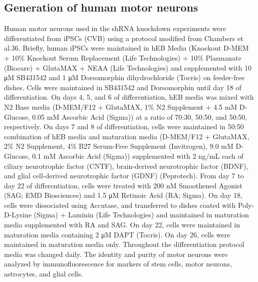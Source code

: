 \subsection{Generation of human motor neurons}
Human motor neurons used in the shRNA knockdown experiments were differentiated from iPSCs (CVB) using a protocol modified from Chambers et al.36. Briefly, human iPSCs were maintained in hEB Media (Knockout D-MEM + 10\% Knockout Serum Replacement (Life Technologies) + 10\% Plasmanate (Biocare) + GlutaMAX + NEAA (Life Technologies) and supplemented with 10 μM SB431542 and 1 μM Dorsomorphin dihydrochloride (Tocris) on feeder-free dishes. Cells were maintained in SB431542 and Dorsomorphin until day 18 of differentiation. On days 4, 5, and 6 of differentiation, hEB media was mixed with N2 Base media (D-MEM/F12 + GlutaMAX, 1\% N2 Supplement + 4.5 mM D-Glucose, 0.05 mM Ascorbic Acid (Sigma)) at a ratio of 70:30, 50:50, and 50:50, respectively. On days 7 and 8 of differentiation, cells were maintained in 50:50 combination of hEB media and maturation media (D-MEM/F12 + GlutaMAX, 2\% N2 Supplement, 4\% B27 Serum-Free Supplement (Invitrogen), 9.0 mM D-Glucose, 0.1 mM Ascorbic Acid (Sigma)) supplemented with 2 ng/mL each of ciliary neurotrophic factor (CNTF), brain-derived neurotrophic factor (BDNF), and glial cell-derived neurotrophic factor (GDNF) (Peprotech). From day 7 to day 22 of differentiation, cells were treated with 200 nM Smoothened Agonist (SAG; EMD Biosciences) and 1.5 μM Retinoic Acid (RA; Sigma). On day 18, cells were dissociated using Accutase, and transferred to dishes coated with Poly-D-Lysine (Sigma) + Laminin (Life Technologies) and maintained in maturation media supplemented with RA and SAG. On day 22, cells were maintained in maturation media containing 2 μM DAPT (Tocris). On day 26, cells were maintained in maturation media only. Throughout the differentiation protocol media was changed daily. The identity and purity of motor neurons were analyzed by immunofluorescence for markers of stem cells, motor neurons, astrocytes, and glial cells.

